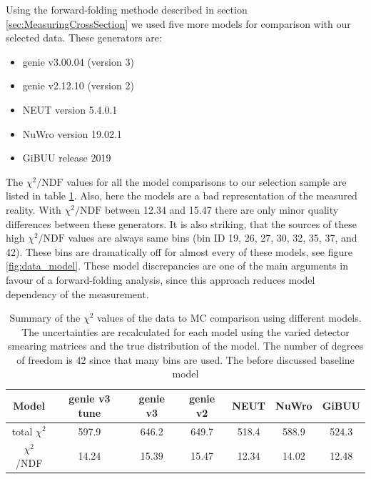 Using the forward-folding methode described in section \ref{sec:MeasuringCrossSection} we used five more models for comparison with our selected data. These generators are:
\begin{itemize}
	\item \gls{genie} v3.00.04 (version 3)
	\item \gls{genie} v2.12.10 (version 2)
	\item NEUT version 5.4.0.1
	\item NuWro version 19.02.1
	\item GiBUU release 2019
\end{itemize}
The $\chi^2/\text{NDF}$ values for all the model comparisons to our selection sample are listed in table \ref{tab:chi2_comp}. Also, here the models are a bad representation of the measured reality. With $\chi^2/\text{NDF}$ between \num{12.34} and \num{15.47} there are only minor quality differences between these generators. It is also striking, that the sources of these high $\chi^2/\text{NDF}$ values are always same bins (bin ID \num{19}, \num{26}, \num{27}, \num{30}, \num{32}, \num{35}, \num{37}, and \num{42}). These bins are dramatically off for almost every of these models, see figure \ref{fig:data_model}. These model discrepancies are one of the main arguments in favour of a forward-folding analysis, since this approach reduces model dependency of the measurement.
\begin{table}[h!]
	\centering
	\begin{tabular}{c|c|c|c|c|c|c}
		\toprule
		Model 			& \gls{genie} v3 tune	&	\gls{genie} v3	&	\gls{genie} v2	&	NEUT 	&	NuWro	&	GiBUU \\
		
		\midrule
		total $\chi^2$	&	597.9	&	646.2	&	649.7	&	518.4	&	588.9	&	524.3\\
		$\chi^2$/NDF	&	14.24	&	15.39	&	15.47	&	12.34	&	14.02	&	12.48\\
		\bottomrule
		
	\end{tabular}
	\caption[$\chi^2$ Values for Different Neutrino Interaction Models]{Summary of the $\chi^2$ values of the data to MC comparison using different models. The uncertainties are recalculated for each model using the varied detector smearing matrices and the true distribution of the model.  The number of degrees of freedom is 42 since that many bins are used. The before discussed baseline model}
	\label{tab:chi2_comp}
\end{table}

